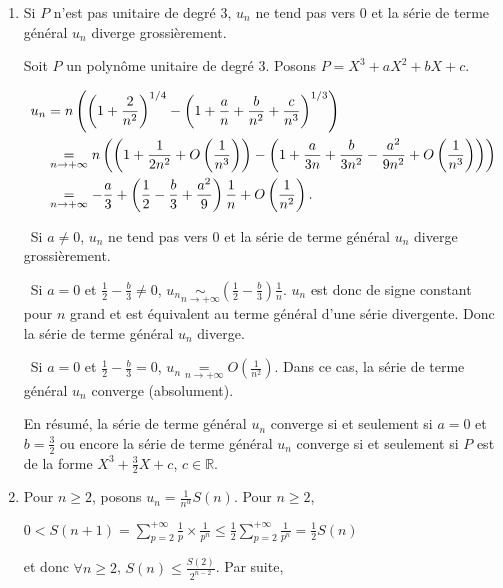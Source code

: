 \documentclass[11pt,a4paper]{article}
\newcommand{\Rr}{\mathbb{R}} \newcommand{\R}{\mathbb{R}}
\begin{document}
\begin{enumerate}
 \item  Si $P$ n'est pas unitaire de degré $3$, $u_n$ ne tend pas vers $0$ et la série de terme général $u_n$ diverge grossièrement.

Soit $P$ un polynôme unitaire de degré $3$. Posons $P =X^3+aX^2+bX+c$.

\begin{align*}\ensuremath
u_n&=n\left(\left(1+\frac{2}{n^2}\right)^{1/4}-\left(1+\frac{a}{n}+\frac{b}{n^2}+\frac{c}{n^3}\right)^{1/3}\right)\\
 &\underset{n\rightarrow+\infty}{=}n\left(\left(1+\frac{1}{2n^2}+O\left(\frac{1}{n^3}\right)\right)-\left(1+\frac{a}{3n}+\frac{b}{3n^2}-\frac{a^2}{9n^2}+O\left(\frac{1}{n^3}\right)\right)\right)\\
 &\underset{n\rightarrow+\infty}{=}-\frac{a}{3}+\left(\frac{1}{2}-\frac{b}{3}+\frac{a^2}{9}\right)\frac{1}{n}+O\left(\frac{1}{n^2}\right).
\end{align*}

\textbullet~Si $a\neq0$, $u_n$ ne tend pas vers $0$ et la série de terme général $u_n$ diverge grossièrement.

\textbullet~Si $a=0$ et $\frac{1}{2}-\frac{b}{3}\neq0$, $u_n\underset{n\rightarrow+\infty}{\sim}\left(\frac{1}{2}-\frac{b}{3}\right)\frac{1}{n}$. $u_n$ est donc de signe constant pour $n$ grand et est équivalent au terme général d'une série divergente. Donc la série de terme général $u_n$ diverge.

\textbullet~Si $a = 0$ et $\frac{1}{2}-\frac{b}{3}= 0$, $u_n\underset{n\rightarrow+\infty}{=}O\left(\frac{1}{n^2}\right)$. Dans ce cas, la série de terme général $u_n$ converge (absolument).

En résumé, la série de terme général $u_n$ converge si et seulement si $a = 0$ et  $b=\frac{3}{2}$ ou encore la série de terme général $u_n$ converge si et seulement si $P$ est de la forme $X^3+\frac{3}{2}X+c$, $c\in\Rr$.

\item  Pour $n\geqslant2$, posons $u_n=\frac{1}{n^\alpha}S(n)$. Pour $n\geqslant2$,

\begin{center}
$0<S(n+1)=\sum_{p=2}^{+\infty}\frac{1}{p}\times\frac{1}{p^n}\leqslant\frac{1}{2}\sum_{p=2}^{+\infty}\frac{1}{p^n}=\frac{1}{2}S(n)$
\end{center}

et donc $\forall n\geqslant2$, $S(n)\leqslant\frac{S(2)}{2^{n-2}}$. Par suite,


\end{enumerate}
\end{document}
